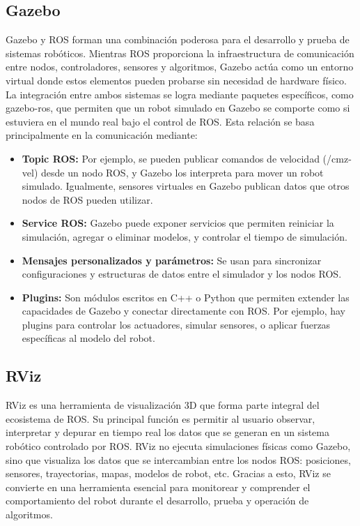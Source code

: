 \subsection{Gazebo}
Gazebo y ROS forman una combinación poderosa para el desarrollo y prueba de sistemas robóticos. Mientras ROS proporciona la infraestructura de comunicación entre nodos, controladores, sensores y algoritmos, Gazebo actúa como un entorno virtual donde estos elementos pueden probarse sin necesidad de hardware físico.
La integración entre ambos sistemas se logra mediante paquetes específicos, como gazebo-ros, que permiten que un robot simulado en Gazebo se comporte como si estuviera en el mundo real bajo el control de ROS. Esta relación se basa principalmente en la comunicación mediante:
\begin{itemize}
    \item \textbf{Topic ROS:} Por ejemplo, se pueden publicar comandos de velocidad (/cmz-vel) desde un nodo ROS, y Gazebo los interpreta para mover un robot simulado. Igualmente, sensores virtuales en Gazebo publican datos que otros nodos de ROS pueden utilizar.
    \item \textbf{Service ROS:} Gazebo puede exponer servicios que permiten reiniciar la simulación, agregar o eliminar modelos, y controlar el tiempo de simulación.
    \item \textbf{Mensajes personalizados y parámetros:} Se usan para sincronizar configuraciones y estructuras de datos entre el simulador y los nodos ROS.
    \item \textbf{Plugins:} Son módulos escritos en C++ o Python que permiten extender las capacidades de Gazebo y conectar directamente con ROS. Por ejemplo, hay plugins para controlar los actuadores, simular sensores, o aplicar fuerzas específicas al modelo del robot.
\end{itemize}
\subsection{RViz}
RViz es una herramienta de visualización 3D que forma parte integral del ecosistema de ROS. Su principal función es permitir al usuario observar, interpretar y depurar en tiempo real los datos que se generan en un sistema robótico controlado por ROS.
RViz no ejecuta simulaciones físicas como Gazebo, sino que visualiza los datos que se intercambian entre los nodos ROS: posiciones, sensores, trayectorias, mapas, modelos de robot, etc. Gracias a esto, RViz se convierte en una herramienta esencial para monitorear y comprender el comportamiento del robot durante el desarrollo, prueba y operación de algoritmos.

